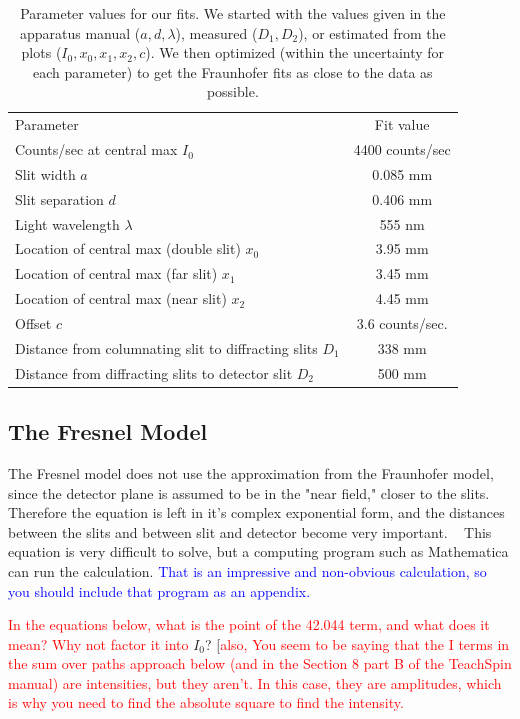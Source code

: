 \documentclass[prb,preprint]{revtex4-1}
\begin{document}
{\begin{table}[h!]
\centering
\caption{Parameter values for our fits. We started with the values given in the apparatus manual ($a, d, \lambda$), measured ($D_1, D_2$), or estimated from the plots ($I_0, x_0, x_1, x_2, c$).  We then optimized (within the uncertainty for each parameter) to get the Fraunhofer fits as close to the data as possible. }
\begin{ruledtabular}
\begin{tabular}{lc}
Parameter & Fit value       \\
Counts/sec at central max $I_0$     & 4400 counts/sec \\
Slit width $a$       & 0.085 mm        \\
Slit separation $d$       & 0.406 mm        \\
Light wavelength $\lambda$ & 555 nm          \\
Location of central max (double slit) $x_0$     & 3.95 mm         \\
Location of central max (far slit) $x_1$     & 3.45 mm \\
Location of central max (near slit) $x_2$ & 4.45 mm \\
Offset $c$       & 3.6 counts/sec. \\
Distance from columnating slit to diffracting slits $D_1$     & 338 mm          \\
Distance from diffracting slits to detector slit $D_2$     & 500 mm         
\end{tabular}
\end{ruledtabular}
\label{parameters}
\end{table}

\subsection{The Fresnel Model}

The Fresnel model does not use the approximation from the Fraunhofer model, since the detector plane is assumed to be in the "near field," closer to the slits. Therefore the equation is left in it's complex exponential form, and the distances between the slits and between slit and detector become very important.  ~\cite{wolfram} This equation is very difficult to solve, but a computing program such as Mathematica can run the calculation.  \textcolor{blue}{That is an impressive and non-obvious calculation, so you should include that program as an appendix.} 

\textcolor{red}{In the equations below, what is the point of the 42.044 term, and what does it mean? Why not factor it into} $I_0$? [\textcolor{red}{also, You seem to be saying that the I terms in the sum over paths approach below (and in the Section 8 part B of the TeachSpin manual) are intensities, but they aren't. In this case, they are amplitudes, which is why you need to find the absolute square to find the intensity.} 

}
\end{document}
